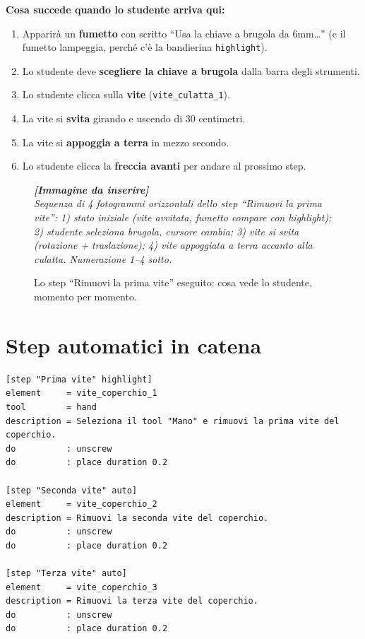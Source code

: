 ﻿\documentclass[a4paper,12pt,oneside]{book}
\newcommand{\val}[1]{\texttt{\color{cvtgreen}#1}}
\newcommand{\imgph}[2]{%
  \begin{tcolorbox}[colback=cvtlightblue!30,colframe=cvtblue!40,%
    width=#1,halign=center,valign=center,height=5cm,boxrule=0.5pt,arc=3pt]%
    \textcolor{cvtgray}{\itshape\footnotesize\textbf{[Immagine da inserire]}\\[3pt]#2}%
  \end{tcolorbox}}
\begin{document}
\textbf{Cosa succede quando lo studente arriva qui:}

\begin{enumerate}
  \item Apparirà un \textbf{fumetto} con scritto ``Usa la chiave a brugola
        da 6mm\ldots'' (e il fumetto lampeggia, perché c'è la bandierina
        \val{highlight}).
  \item Lo studente deve \textbf{scegliere la chiave a brugola} dalla barra
        degli strumenti.
  \item Lo studente clicca sulla \textbf{vite} (\texttt{vite\_culatta\_1}).
  \item La vite si \textbf{svita} girando e uscendo di 30 centimetri.
  \item La vite si \textbf{appoggia a terra} in mezzo secondo.
  \item Lo studente clicca la \textbf{freccia avanti} per andare al prossimo step.
\end{enumerate}

\begin{figure}[H]
  \centering
  \imgph{13cm}{Sequenza di 4 fotogrammi orizzontali dello step ``Rimuovi la prima vite'': 1) stato iniziale (vite avvitata, fumetto compare con highlight); 2) studente seleziona brugola, cursore cambia; 3) vite si svita (rotazione + traslazione); 4) vite appoggiata a terra accanto alla culatta. Numerazione 1--4 sotto.}
  \caption{Lo step ``Rimuovi la prima vite'' eseguito: cosa vede lo studente, momento per momento.}
  \label{fig:sequenza-step-completo}
\end{figure}

\section{Step automatici in catena}

\begin{esempiocvt}
\begin{lstlisting}
[step "Prima vite" highlight]
element     = vite_coperchio_1
tool        = hand
description = Seleziona il tool "Mano" e rimuovi la prima vite del coperchio.
do          : unscrew
do          : place duration 0.2

[step "Seconda vite" auto]
element     = vite_coperchio_2
description = Rimuovi la seconda vite del coperchio.
do          : unscrew
do          : place duration 0.2

[step "Terza vite" auto]
element     = vite_coperchio_3
description = Rimuovi la terza vite del coperchio.
do          : unscrew
do          : place duration 0.2
\end{lstlisting}
\end{esempiocvt}
\end{document}
